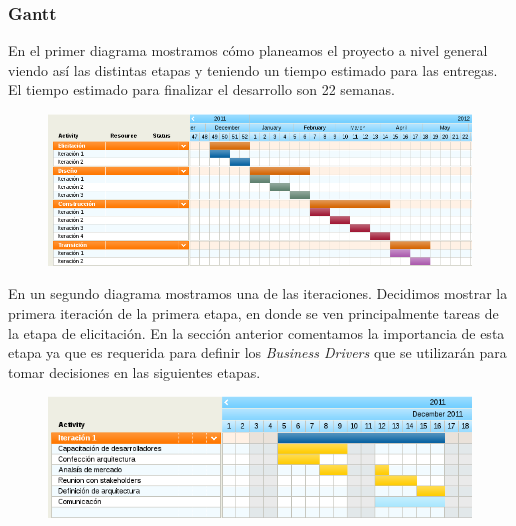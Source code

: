 \subsubsection{Gantt}


En el primer diagrama mostramos cómo planeamos el proyecto a nivel general viendo así las distintas etapas y teniendo un tiempo estimado para las entregas. El tiempo estimado para
finalizar el desarrollo son 22 semanas.	

\begin{figure}[H]
 \includegraphics[scale=0.7]{./ganttetapas.png}
\end{figure}

En un segundo diagrama mostramos una de las iteraciones. Decidimos mostrar la primera iteración de la primera etapa, en donde se ven principalmente tareas de la etapa de elicitación. En la sección anterior comentamos la importancia de esta etapa ya que es requerida para definir los \emph{Business Drivers} que se utilizar\'an para tomar decisiones en las siguientes etapas.

\begin{figure}[H]
\begin{center}
 \includegraphics[scale=0.7]{./ganttiteracion.png}
\end{center}
\end{figure}

\renewcommand{\labelitemi}{$\tiny \blacksquare$}

